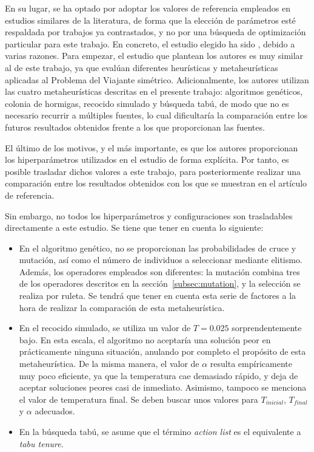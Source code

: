 En su lugar, se ha optado por adoptar los valores de referencia empleados en estudios similares de la literatura, de forma que
la elección de parámetros esté respaldada por trabajos ya contrastados, y no por una búsqueda de optimización particular para
este trabajo. En concreto, el estudio elegido ha sido \cite{halim2019}, debido a varias razones. Para empezar, el estudio que
plantean los autores es muy similar al de este trabajo, ya que evalúan diferentes heurísticas y metaheurísticas aplicadas al 
Problema del Viajante simétrico. Adicionalmente, los autores utilizan las cuatro metaheurísticas descritas en el presente
trabajo: algoritmos genéticos, colonia de hormigas, recocido simulado y búsqueda tabú, de modo que no es necesario recurrir 
a múltiples fuentes, lo cual dificultaría la comparación entre los futuros resultados obtenidos frente a los que proporcionan
las fuentes. 

El último de los motivos, y el más importante, es que los autores proporcionan los hiperparámetros utilizados en el estudio 
de forma explícita. Por tanto, es posible trasladar dichos valores a este trabajo, para posteriormente realizar una comparación
entre los resultados obtenidos con los que se muestran en el artículo de referencia.

Sin embargo, no todos los hiperparámetros y configuraciones son trasladables directamente a este estudio. Se tiene que tener en
cuenta lo siguiente:
\begin{itemize}
  \item En el algoritmo genético, no se proporcionan las probabilidades de cruce y mutación, así como el número de individuos
  a seleccionar mediante elitismo. Además, los operadores empleados son diferentes: la mutación combina tres de los operadores
  descritos en la sección~\ref{subsec:mutation}, y la selección se realiza por ruleta. Se tendrá que tener en cuenta esta 
  serie de factores a la hora de realizar la comparación de esta metaheurística.
  \item En el recocido simulado, se utiliza un valor de $T=0.025$ sorprendentemente bajo. En esta escala, el algoritmo no 
  aceptaría una solución peor en prácticamente ninguna situación, anulando por completo el propósito de esta metaheurística.
  De la misma manera, el valor de $\alpha$ resulta empíricamente muy poco eficiente, ya que la temperatura cae demasiado 
  rápido, y deja de aceptar soluciones peores casi de inmediato. Asimismo, tampoco se menciona el valor de temperatura final.
  Se deben buscar unos valores para $T_{inicial}$, $T_{final}$ y $\alpha$ adecuados.
  \item En la búsqueda tabú, se asume que el término \textit{action list} es el equivalente a \textit{tabu tenure}.
\end{itemize}

